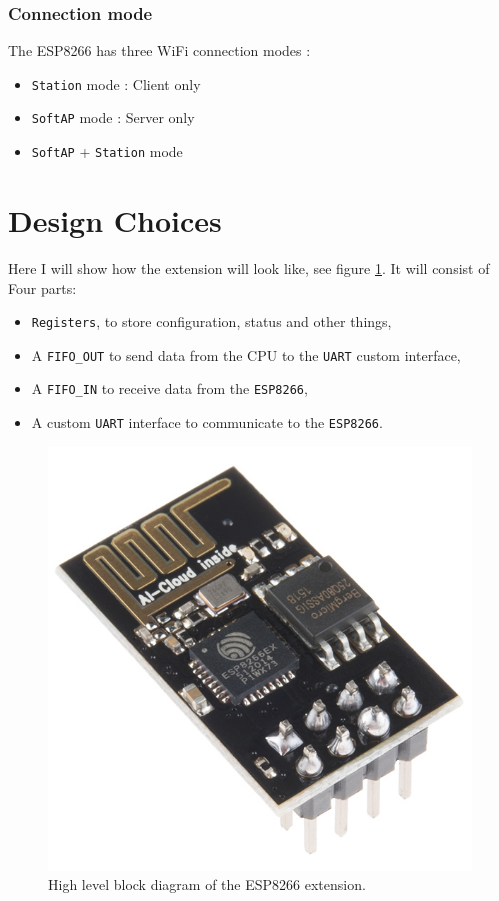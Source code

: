 \documentclass[11pt]{article}
\begin{document}
\subsubsection{Connection mode}
The ESP8266 has three WiFi connection modes :
\begin{itemize}
    \item \texttt{Station} mode : Client only
    \item \texttt{SoftAP} mode : Server only
    \item \texttt{SoftAP} + \texttt{Station} mode
\end{itemize}

\section{Design Choices}
Here I will show how the extension will look like, see figure \ref{high_level}. It will consist of Four parts:
\begin{itemize}
    \item \texttt{Registers}, to store configuration, status and other things,
    \item A \texttt{FIFO\_OUT} to send data from the CPU to the \texttt{UART} custom interface,
    \item A \texttt{FIFO\_IN} to receive data from the \texttt{ESP8266},
    \item A custom \texttt{UART} interface to communicate to the \texttt{ESP8266}.
\end{itemize}
\begin{figure}[H]
    \includegraphics[width=.7\linewidth]{ESP8266.jpg}
    \caption{High level block diagram of the ESP8266 extension.}
    \label{high_level}
\end{figure}
\end{document}
